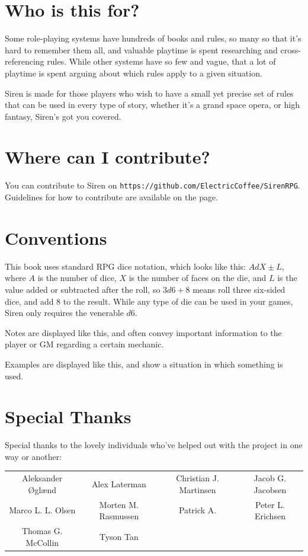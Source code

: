 \documentclass[a4paper]{book}
\begin{document}
\section*{Who is this for?}
Some role-playing systems have hundreds of books and rules, so many so that it's hard to remember them all, and valuable playtime is spent researching and cross-referencing rules. 
While other systems have so few and vague, that a lot of playtime is spent arguing about which rules apply to a given situation.

Siren is made for those players who wish to have a small yet precise set of rules that can be used in every type of story, whether it's a grand space opera, or high fantasy, Siren's got you covered.

\section*{Where can I contribute?}
You can contribute to Siren on \texttt{https://github.com/ElectricCoffee/SirenRPG}.
Guidelines for how to contribute are available on the page.

\section*{Conventions}
This book uses standard RPG dice notation, which looks like this: $AdX\pm L$, where $A$ is the number of dice, $X$ is the number of faces on the die, and $L$ is the value added or subtracted after the roll, so $3d6+8$ means roll three six-sided dice, and add 8 to the result.
While any type of die can be used in your games, Siren only requires the venerable $d6$.

\note Notes are displayed like this, and often convey important information to the player or GM regarding a certain mechanic.

\example Examples are displayed like this, and show a situation in which something is used.

\section*{Special Thanks}
Special thanks to the lovely individuals who've helped out with the project in one way or another:
\begin{center}
    \begin{tabular}{cccc}
        Aleksander Øglænd & Alex Laterman & Christian J. Martinsen & Jacob G. Jacobsen \\
        Marco L. L. Olsen & Morten M. Rasmussen & Patrick A. & Peter L. Erichsen \\ Thomas G. McCollin & Tyson Tan \\
    \end{tabular}
\end{center}
\end{document}
